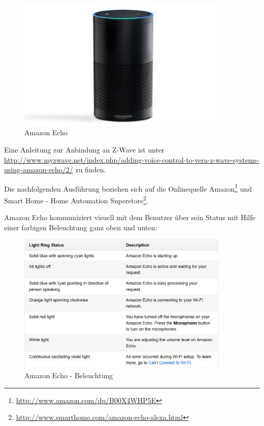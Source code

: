 \begin{figure}[h!]
	\centering
	\includegraphics[width=0.9\textwidth]{img/Feedback-Mechanismen/AmazonEcho.png}
	\caption{Amazon Echo}
	\label{fig:feedbackAmazonEcho}
\end{figure}

Eine Anleitung zur Anbindung an Z-Wave ist unter \url{http://www.myzwave.net/index.php/adding-voice-control-to-vera-z-wave-systems-using-amazon-echo/2/} zu finden.

Die nachfolgenden Ausführung beziehen sich auf die Onlinequelle \glqq Amazon\grqq\footnote{\url{http://www.amazon.com/dp/B00X4WHP5E}} und \glqq Smart Home - Home Automation Superstore\grqq \footnote{\url{http://www.smarthome.com/amazon-echo-alexa.html}}.

Amazon Echo kommuniziert visuell mit dem Benutzer über sein Status mit Hilfe einer farbigen Beleuchtung ganz oben und unten:

\begin{figure}[h!]
	\centering
	\includegraphics[width=0.9\textwidth]{img/Feedback-Mechanismen/AmazonEchoLight.png}
	\caption{Amazon Echo - Beleuchtung}
	\label{fig:feedbackAmazonEchoLights}
\end{figure}

